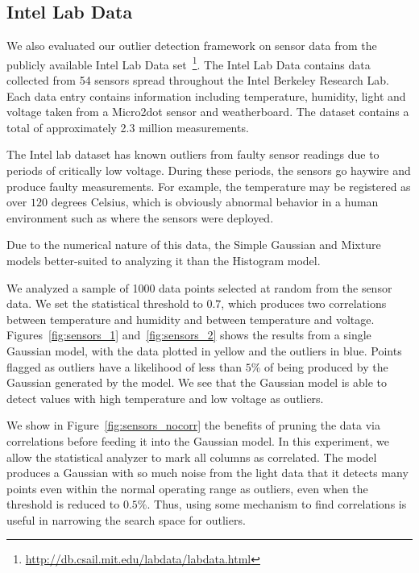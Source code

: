 \subsection{Intel Lab Data}
\label{sec:intel-lab-data-evaluation}

We also evaluated our outlier detection framework on sensor data from the publicly available Intel Lab Data set~\footnote{\url{http://db.csail.mit.edu/labdata/labdata.html}}. The Intel Lab Data contains data collected from 54 sensors spread throughout the Intel Berkeley Research Lab. Each data entry contains information including temperature, humidity, light and voltage taken from a Micro2dot sensor and weatherboard. The dataset contains a total of approximately 2.3 million measurements.

The Intel lab dataset has known outliers from faulty sensor readings due to periods of critically low voltage. During these periods, the sensors go haywire and produce faulty measurements.
For example, the temperature may be registered as over $120$ degrees Celsius, which is obviously abnormal behavior in a human environment such as where the sensors were deployed.
 
Due to the numerical nature of this data, the Simple Gaussian and Mixture models better-suited to analyzing it than the Histogram model.
 
We analyzed a sample of 1000 data points selected at random from the sensor data. 
We set the statistical threshold to $0.7$, which produces two correlations between temperature and humidity and between temperature and voltage.
Figures~\ref{fig:sensors_1} and~\ref{fig:sensors_2} shows the results from a single Gaussian model, with the data plotted in yellow and the outliers in blue.
Points flagged as outliers have a likelihood of less than $5\%$ of being produced by the Gaussian generated by the model.
We see that the Gaussian model is able to detect values with high temperature and low voltage as outliers.
 
We show in Figure~\ref{fig:sensors_nocorr} the benefits of pruning the data via correlations before feeding it into the Gaussian model.
In this experiment, we allow the statistical analyzer to mark all columns as correlated.
The model produces a Gaussian with so much noise from the light data that it detects many points even within the normal operating range as outliers, even when the threshold is reduced to $0.5\%$. 
Thus, using some mechanism to find correlations is useful in narrowing the search space for outliers.
 
